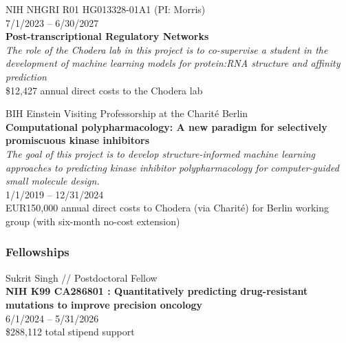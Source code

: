 \documentclass[10pt]{article}
\begin{document}
\vspace{1.5ex}

NIH NHGRI R01 HG013328-01A1 (PI: Morris)\\
7/1/2023 -- 6/30/2027\\
{\bf Post-transcriptional Regulatory Networks}\\
\emph{The role of the Chodera lab in this project is to co-supervise a student in the development of machine learning models for protein:RNA structure and affinity prediction}\\
\$12,427 annual direct costs to the Chodera lab\\

\vspace{1.5ex}

BIH Einstein Visiting Professorship at the Charit\'{e} Berlin\\
{\bf Computational polypharmacology: A new paradigm for selectively promiscuous kinase inhibitors}\\
\emph{The goal of this project is to develop structure-informed machine learning approaches to predicting kinase inhibitor polypharmacology for computer-guided small molecule design.}\\
1/1/2019 -- 12/31/2024\\
EUR150,000 annual direct costs to Chodera (via Charit\'{e}) for Berlin working group (with six-month no-cost extension)

%

\vspace{-0.1in} 

\subsubsection*{Fellowships}

Sukrit Singh // Postdoctoral Fellow \\
{\bf NIH K99 CA286801 : Quantitatively predicting drug-resistant mutations to improve precision oncology}\\
6/1/2024 -- 5/31/2026\\
\$288,112 total stipend support
\end{document}
